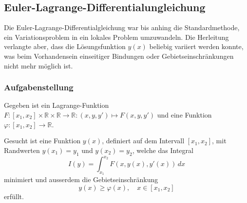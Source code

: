 %
%
\subsection{Euler-Lagrange-Differentialungleichung
\label{buch:nebenbedingungen:einseitig:subsection:eldgl}}
Die Euler-Lagrange-Differentialgleichung war bis anhing die Standardmethode,
ein Variationsproblem in ein lokales Problem umzuwandeln.
Die Herleitung verlangte aber, dass die Lösungsfunktion $y(x)$ beliebig
variiert werden konnte, was beim Vorhandensein einseitiger Bindungen
oder Gebietseinschränkungen nicht mehr möglich ist.

%
%
\subsubsection{Aufgabenstellung}
Gegeben ist ein Lagrange-Funktion
$F\colon [x_1,x_2]\times\mathbb{R}\times\mathbb{R}\to\mathbb{R}:(x,y,y')\mapsto F(x,y,y')$ 
und eine Funktion $\varphi\colon[x_1,x_2]\to\mathbb{R}$.

\begin{aufgabe}
\label{buch:nebenbedingungen:einseitig:aufgabe}
Gesucht ist eine Funktion $y(x)$, definiert auf dem Intervall $[x_1,x_2]$,
mit Randwerten $y(x_1) = y_1$ und $y(x_2)=y_2$, welche das Integral
\[
I(y)
=
\int_{x_1}^{x_2} F(x,y(x),y'(x))\,dx
\]
minimiert und ausserdem die Gebietseinschränkung
\[
y(x) \ge \varphi(x), \quad x\in[x_1,x_2]
\]
erfüllt.
\end{aufgabe}

%
%
